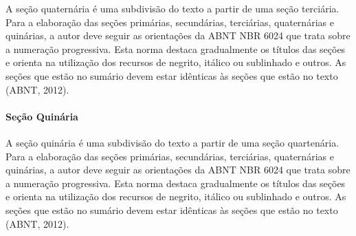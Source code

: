 A seção quaternária é uma subdivisão do texto a partir de uma seção terciária.
Para a elaboração das seções primárias, secundárias, terciárias, quaternárias
e quinárias, a autor deve seguir as orientações da ABNT NBR 6024 que trata
sobre a numeração progressiva. Esta norma destaca gradualmente os títulos das
seções e orienta na utilização dos recursos de negrito, itálico ou sublinhado
e outros. As seções que estão no sumário devem estar idênticas às seções que
estão no texto (ABNT, 2012).

\textopadrao

\paragraph{Seção Quinária}

A seção quinária é uma subdivisão do texto a partir de uma seção quartenária.
Para a elaboração das seções primárias, secundárias, terciárias, quaternárias
e quinárias, a autor deve seguir as orientações da ABNT NBR 6024 que trata
sobre a numeração progressiva. Esta norma destaca gradualmente os títulos das
seções e orienta na utilização dos recursos de negrito, itálico ou sublinhado
e outros. As seções que estão no sumário devem estar idênticas às seções que
estão no texto (ABNT, 2012).

\textopadrao
